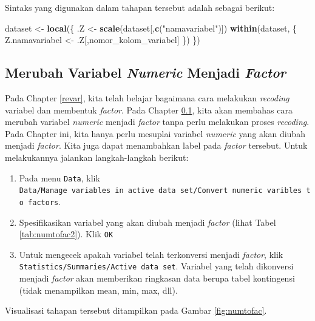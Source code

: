 \documentclass[12pt,]{krantz}
\newenvironment{Shaded}{\begin{snugshade}}{\end{snugshade}}
\newcommand{\KeywordTok}[1]{\textcolor[rgb]{0.13,0.29,0.53}{\textbf{#1}}}
\newcommand{\NormalTok}[1]{#1}
\newcommand{\StringTok}[1]{\textcolor[rgb]{0.31,0.60,0.02}{#1}}
\providecommand{\tightlist}{%
  \setlength{\itemsep}{0pt}\setlength{\parskip}{0pt}}
\begin{document}
Sintaks yang digunakan dalam tahapan tersebut adalah sebagai berikut:

\begin{Shaded}
\begin{Highlighting}[]
\NormalTok{dataset <-}\StringTok{ }\KeywordTok{local}\NormalTok{(\{}
\NormalTok{  .Z <-}\StringTok{ }\KeywordTok{scale}\NormalTok{(dataset[,}\KeywordTok{c}\NormalTok{(}\StringTok{"namavariabel"}\NormalTok{)])}
  \KeywordTok{within}\NormalTok{(dataset, \{}
\NormalTok{    Z.namavariabel <-}\StringTok{ }\NormalTok{.Z[,nomor_kolom_variabel] }
\NormalTok{  \})}
\NormalTok{\})}
\end{Highlighting}
\end{Shaded}

\hypertarget{numfac}{%
\subsection{\texorpdfstring{Merubah Variabel \emph{Numeric} Menjadi \emph{Factor}}{Merubah Variabel Numeric Menjadi Factor}}\label{numfac}}

Pada Chapter \ref{revar}, kita telah belajar bagaimana cara melakukan \emph{recoding} variabel dan membentuk \emph{factor}. Pada Chapter \ref{numfac}, kita akan membahas cara merubah variabel \emph{numeric} menjadi \emph{factor} tanpa perlu melakukan proses \emph{recoding}. Pada Chapter ini, kita hanya perlu mesuplai variabel \emph{numeric} yang akan diubah menjadi \emph{factor}. Kita juga dapat menambahkan label pada \emph{factor} tersebut. Untuk melakukannya jalankan langkah-langkah berikut:

\begin{enumerate}
\def\labelenumi{\arabic{enumi}.}
\tightlist
\item
  Pada menu \texttt{Data}, klik \texttt{Data/Manage\ variables\ in\ active\ data\ set/Convert\ numeric\ varibles\ to\ factors}.
\item
  Spesifikasikan variabel yang akan diubah menjadi \emph{factor} (lihat Tabel \ref{tab:numtofac2}). Klik \texttt{OK}
\item
  Untuk mengecek apakah variabel telah terkonversi menjadi \emph{factor}, klik \texttt{Statistics/Summaries/Active\ data\ set}. Variabel yang telah dikonversi menjadi \emph{factor} akan memberikan ringkasan data berupa tabel kontingensi (tidak menampilkan mean, min, max, dll).
\end{enumerate}

Visualisasi tahapan tersebut ditampilkan pada Gambar \ref{fig:numtofac}.
\end{document}
